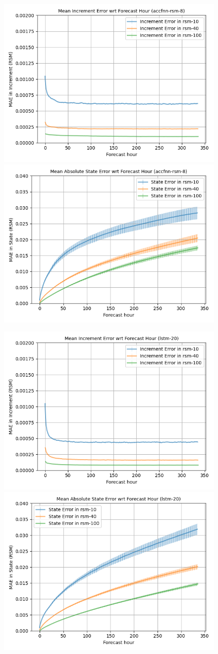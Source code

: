 \begin{figure}[h!]
    \centering

    \includegraphics[width=.42\linewidth,draft=false]{figures/horizons/eval_best-redo_accfnn-rsm-8_rsm_horizon_na_res.png}
    \includegraphics[width=.42\linewidth,draft=false]{figures/horizons/eval_best-redo_accfnn-rsm-8_rsm_horizon_na_state.png}

    \includegraphics[width=.42\linewidth,draft=false]{figures/horizons/eval_best-redo_lstm-20_rsm_horizon_na_res.png}
    \includegraphics[width=.42\linewidth,draft=false]{figures/horizons/eval_best-redo_lstm-20_rsm_horizon_na_state.png}


\end{figure}
